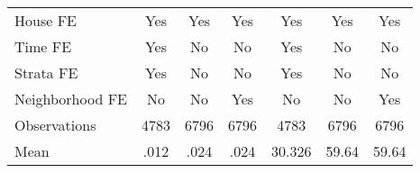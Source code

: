 {\begin{tabular}{l*{6}{c}}
House FE        &      Yes         &      Yes         &      Yes         &      Yes         &      Yes         &      Yes         \\
Time FE         &      Yes         &       No         &       No         &      Yes         &       No         &       No         \\
Strata FE       &      Yes         &       No         &       No         &      Yes         &       No         &       No         \\
Neighborhood FE &       No         &       No         &      Yes         &       No         &       No         &      Yes         \\
\hline
Observations    &     4783         &     6796         &     6796         &     4783         &     6796         &     6796         \\
Mean            &     .012         &     .024         &     .024         &   30.326         &    59.64         &    59.64         \\
\hline\hline
\end{tabular}
}
